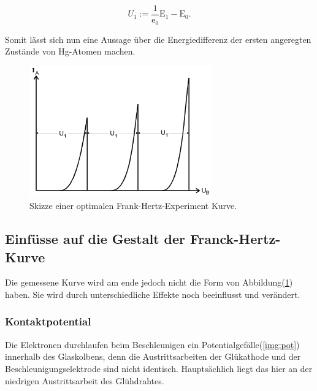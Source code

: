         \begin{equation*}
            U_1 := \frac{1}{\text{e}_0} \text{E}_1 - \text{E}_0 .
        \end{equation*}

        \noindent Somit lässt sich nun eine Aussage über die Energiedifferenz der ersten angeregten Zustände von Hg-Atomen machen.

        \begin{figure}[ht]
            \centering
            \includegraphics[width=0.7\textwidth]{latex/images/Kamm.PNG}
            \caption{Skizze einer optimalen Frank-Hertz-Experiment Kurve.}
            \label{img:Kamm}
        \end{figure}

    \subsection{Einfüsse auf die Gestalt der Franck-Hertz-Kurve}

        \noindent Die gemessene Kurve wird am ende jedoch nicht die Form von Abbildung(\ref{img:Kamm}) haben. Sie wird durch unterschiedliche Effekte 
        noch beeinflusst und verändert.

        \subsubsection{Kontaktpotential}

            \noindent Die Elektronen durchlaufen beim Beschleunigen ein Potentialgefälle(\ref{img:pot}) innerhalb des Glaskolbens, denn die Austrittsarbeiten der 
            Glükathode und der Beschleunigungselektrode sind nicht identisch. Hauptsächlich liegt das hier an der niedrigen Austrittsarbeit des 
            Glühdrahtes.

